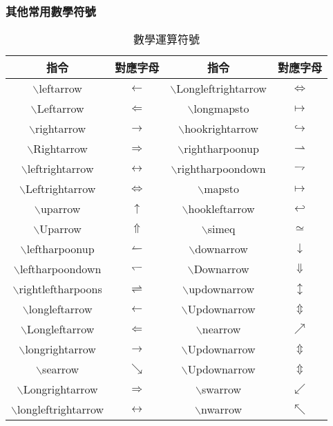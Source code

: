 \subsubsection{其他常用數學符號}
\begin{longtable}{c c c c}
    \caption{數學運算符號}\label{tb:sign} \\
     指令 & 對應字母 & 指令 & 對應字母 \\\hline 
     {\A $\backslash$leftarrow} & $\leftarrow$ & {\A $\backslash$Longleftrightarrow	} & $\Longleftrightarrow$ \\
     {\A $\backslash$Leftarrow}  & $\Leftarrow$ & {\A $\backslash$longmapsto} & $\longmapsto$ \\
     {\A $\backslash$rightarrow} & $\rightarrow$	& {\A $\backslash$hookrightarrow} & $\hookrightarrow$ \\
     {\A $\backslash$Rightarrow} & $\Rightarrow$ & {\A $\backslash$rightharpoonup} & $\rightharpoonup$ \\
     {\A $\backslash$leftrightarrow} & $\leftrightarrow$ & {\A $\backslash$rightharpoondown} & $\rightharpoondown$ \\
     {\A $\backslash$Leftrightarrow} & $\Leftrightarrow$ & {\A $\backslash$mapsto} & $\mapsto$ \\
     {\A $\backslash$uparrow} &  $\uparrow$ & {\A $\backslash$hookleftarrow}  & $\hookleftarrow$ \\
     {\A $\backslash$Uparrow} & $\Uparrow$ & {\A $\backslash$simeq}  & $\simeq$ \\
     {\A $\backslash$leftharpoonup} & $\leftharpoonup$ & {\A $\backslash$downarrow} & $\downarrow$ \\
     {\A $\backslash$leftharpoondown} & $\leftharpoondown$ & {\A $\backslash$Downarrow} & $\Downarrow$ \\
     {\A $\backslash$rightleftharpoons} & $\rightleftharpoons$ & {\A $\backslash$updownarrow} & $\updownarrow$ \\
     {\A $\backslash$longleftarrow} & $\longleftarrow$ & {\A $\backslash$Updownarrow} & $\Updownarrow$ \\
     {\A $\backslash$Longleftarrow} & $\Longleftarrow$ & {\A $\backslash$nearrow} & $\nearrow$ \\
     {\A $\backslash$longrightarrow} & $\longrightarrow$ & {\A $\backslash$Updownarrow} & $\Updownarrow$ \\
     {\A $\backslash$searrow} & $\searrow$ & {\A $\backslash$Updownarrow} & $\Updownarrow$ \\
     {\A $\backslash$Longrightarrow} & $\Longrightarrow$ & {\A $\backslash$swarrow} & $\swarrow$ \\
     {\A $\backslash$longleftrightarrow} & $\longleftrightarrow$ & {\A $\backslash$nwarrow} & $\nwarrow$ \\\hline
\end{longtable}

